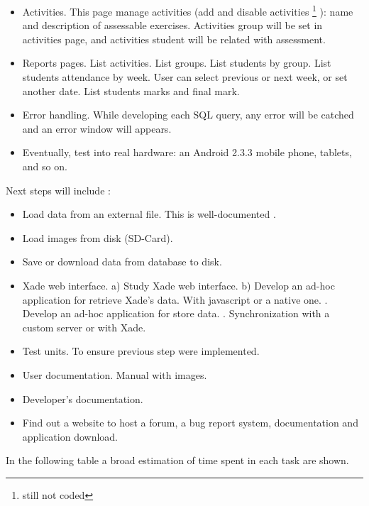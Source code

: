 \begin{itemize}
  \item  Activities. This page manage activities (add and disable activities \footnote{still not coded} ): name and description of assessable exercises. 
  \subitem  Activities group will be set in activities page, and activities student will be related with assessment.
  \item Reports pages.
  \subitem  List activities.
  \subitem  List groups.
  \subitem  List students by group.
  \subitem  List students attendance by week. User can select previous or next week, or set another date.
  \subitem  List students marks and final mark.
  
  \item Error handling. While developing each SQL query, any error will be catched and an error window will appears. 
  \item Eventually, test into real hardware: an Android 2.3.3 mobile phone, tablets, and so on.
  \end{itemize}
  
	   Next steps will include :  
  \begin{itemize}
  \item   Load data from an external file. This is well-documented \cite{}.  
  \item   Load images from disk (SD-Card).
  \item  Save or download data from database to disk.
  \item  Xade web interface.
  \subitem    a) Study Xade web interface.
  \subitem    b) Develop an ad-hoc application for retrieve Xade's data. With javascript or a native one. 
  . Develop an ad-hoc application for store data. 
  . Synchronization with a custom server or with Xade.
  \item   Test units. To ensure previous step were implemented.
  \item   User documentation. Manual with images.
  \item   Developer's documentation.
  \item   Find out a website to host a forum, a bug report system,  documentation and application download.
	\end{itemize}
	
In the following table a broad estimation of time spent in each task are shown.  


